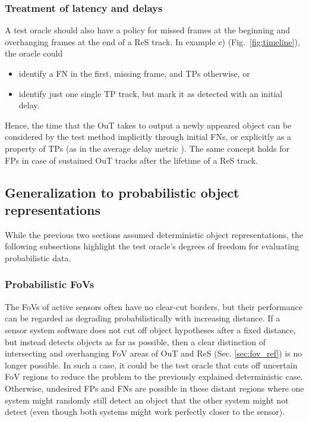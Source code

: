 \documentclass[conference]{IEEEtran}
\begin{document}


\subsubsection{Treatment of latency and delays}
\label{sec:temp_latency}

A test oracle should also have a policy for missed frames at the beginning and overhanging frames at the end of a ReS track. 
In example c) (Fig.~\ref{fig:timeline}), the oracle could
\begin{itemize}
	\item identify a FN in the first, missing frame, and TPs otherwise, or
	\item identify just one single TP track, but mark it as detected with an initial delay.
\end{itemize}

Hence, the time that the OuT takes to output a newly appeared object can be considered by the test method implicitly through initial FNs, or explicitly as a property of TPs (as in the average delay metric \cite{Mao2019delay}).
The same concept holds for FPs in case of sustained OuT tracks after the lifetime of a ReS track.



\subsection{Generalization to probabilistic object representations}
\label{sec:oracle_probabilistic}

While the previous two sections assumed deterministic object representations, the following subsections highlight the test oracle's degrees of freedom for evaluating probabilistic data.

\subsubsection{Probabilistic FoVs}
\label{sec:prob_fov}

The FoVs of active sensors often have no clear-cut borders, but their performance can be regarded as degrading probabilistically with increasing distance. 
If a sensor system software does not cut off object hypotheses after a fixed distance, but instead detects objects as far as possible, then a clear distinction of intersecting and overhanging FoV areas of OuT and ReS (Sec. \ref{sec:fov_ref}) is no longer possible.
In such a case, it could be the test oracle that cuts off uncertain FoV regions to reduce the problem to the previously explained deterministic case.
Otherwise, undesired FPs and FNs are possible in these distant regions where one system might randomly still detect an object that the other system might not detect (even though both systems might work perfectly closer to the sensor).
\end{document}
